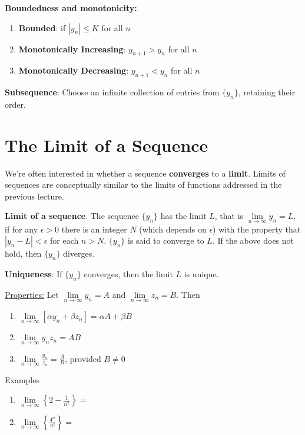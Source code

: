 \documentclass[]{book}
\providecommand{\tightlist}{%
  \setlength{\itemsep}{0pt}\setlength{\parskip}{0pt}}
\theoremstyle{definition}
\theoremstyle{definition}
\theoremstyle{definition}
\theoremstyle{remark}
\begin{document}
\textbf{Boundedness and monotonicity:}

\begin{enumerate}
\def\labelenumi{\arabic{enumi}.}
\tightlist
\item
  \textbf{Bounded}: if \(|y_n|\le K\) for all \(n\)
\item
  \textbf{Monotonically Increasing}: \(y_{n+1}>y_n\) for all \(n\)
\item
  \textbf{Monotonically Decreasing}: \(y_{n+1}<y_n\) for all \(n\)
\end{enumerate}

\textbf{Subsequence}: Choose an infinite collection of entries from
\(\{ y_n \}\), retaining their order.

\section{The Limit of a Sequence}\label{the-limit-of-a-sequence}

We're often interested in whether a sequence \textbf{converges} to a
\textbf{limit}. Limits of sequences are conceptually similar to the
limits of functions addressed in the previous lecture.

\textbf{Limit of a sequence}. The sequence \(\{y_n\}\) has the limit
\(L\), that is \(\lim\limits_{n \to \infty} y_n =L\), if for any
\(\epsilon>0\) there is an integer \(N\) (which depends on \(\epsilon\))
with the property that \(|y_n -L|<\epsilon\) for each \(n>N\).
\(\{y_n\}\) is said to converge to \(L\). If the above does not hold,
then \(\{y_n\}\) diverges.

\textbf{Uniqueness}: If \(\{y_n\}\) converges, then the limit \(L\) is
unique.

\underline{Properties:} Let \(\lim\limits_{n \to \infty} y_n = A\) and
\(\lim\limits_{n \to \infty} z_n =B\). Then

\begin{enumerate}
        \item $\lim\limits_{n \to \infty} [\alpha y_n + \beta z_n]=\alpha A+\beta B$
        \item $\lim\limits_{n \to \infty} y_n z_n = A B$
        \item $\lim\limits_{n \to \infty} \frac{y_n}{z_n} = \frac{A}{B}$, provided $B\ne 0$
\end{enumerate}

Examples

\begin{enumerate}
        \item $\lim\limits_{n \to \infty} \left\{ 2-\frac{1}{n^2} 
        \right\} = $
        \item $\lim\limits_{n \to \infty} \left\{ \frac{4^n}{n!} \right\} 
        = $
\end{enumerate}
\end{document}
